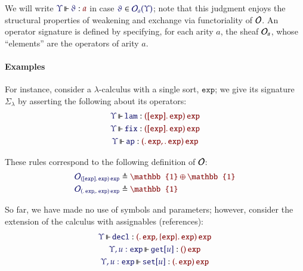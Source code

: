 \documentclass[11pt]{article}
\theoremstyle{definition}
\theoremstyle{remark}
\numberwithin{equation}{section}
\newcommand\SortExp{\mathtt{exp}}
\begin{document}
We will write $\IsOperator{\Upsilon}{\vartheta}{a}$ in case
$\Member{\vartheta}{\Operators_a(\Upsilon)}$; note that this judgment enjoys
the structural properties of weakening and exchange via functoriality of
$\mathcal{O}$. An operator signature is defined by specifying, for each arity
$a$, the sheaf $\mathcal{O}_a$, whose ``elements'' are the operators of arity
$a$.


\paragraph{Examples}

For instance, consider a $\lambda$-calculus with a single sort, $\SortExp$; we
give its signature $\Sigma_{\lambda}$ by asserting the following about its
operators:
\begin{gather*}
  \IsOperator{\Upsilon}{\mathtt{lam}}{
    \MkArity{
      \MkValence{}{\SortExp}{\SortExp}
    }{\SortExp}
  }\\
  \IsOperator{\Upsilon}{\mathtt{fix}}{
    \MkArity{
      \MkValence{}{\SortExp}{\SortExp}
    }{\SortExp}
  }\\
  \IsOperator{\Upsilon}{\mathtt{ap}}{
    \MkArity{
      \MkValence{}{}{\SortExp},
      \MkValence{}{}{\SortExp}
    }{\SortExp}
  }
\end{gather*}

These rules correspond to the following definition of $\mathcal{O}$:
\begin{align*}
  \ADefine{
    \Operators_{
       \MkArity{
        \MkValence{}{\SortExp}{\SortExp}
      }{\SortExp}
    }
  }{
    \mathbb{1}\oplus\mathbb{1}
  }
  \\
  \ADefine{
    \Operators_{
      \MkArity{
        \MkValence{}{}{\SortExp},
        \MkValence{}{}{\SortExp}
      }{\SortExp}
    }
  }{
    \mathbb{1}
  }
\end{align*}

So far, we have made no use of symbols and parameters; however, consider the
extension of the calculus with assignables (references):
%
\begin{gather*}
  \IsOperator{\Upsilon}{\mathtt{decl}}{
    \MkArity{
      \MkValence{}{}{\SortExp},
      \MkValence{\SortExp}{}{\SortExp}
    }{
      \SortExp
    }
  }
\\
  \IsOperator{\Upsilon,u:\SortExp}{\mathtt{get}[u]}{
    \MkArity{}{\SortExp}
  }
\\
  \IsOperator{\Upsilon,u:\SortExp}{\mathtt{set}[u]}{
    \MkArity{
      \MkValence{}{}{\SortExp}
    }{
      \SortExp
    }
  }
\end{gather*}
\end{document}
